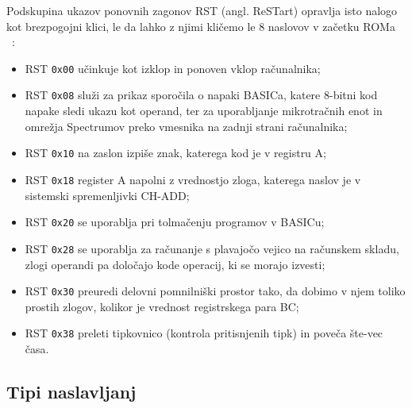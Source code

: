 \documentclass[a4paper, 12pt, openright]{book}
\begin{document}
    Podskupina ukazov ponovnih zagonov RST (angl. ReSTart) opravlja isto nalogo kot
    brezpogojni klici, le da lahko z njimi kličemo le 8 naslovov v začetku ROMa
    ~\cite{strojnijezikzaprocesorz80}:
    \begin{itemize}
        \item RST \texttt{0x00} učinkuje kot izklop in ponoven vklop računalnika;

        \item RST \texttt{0x08} služi za prikaz sporočila o napaki BASICa, katere
            8-bitni kod napake sledi ukazu kot operand, ter za uporabljanje
            mikrotračnih enot in omrežja Spectrumov preko vmesnika na zadnji
            strani računalnika;

        \item RST \texttt{0x10} na zaslon izpiše znak, katerega kod je v registru
            A;

        \item RST \texttt{0x18} register A napolni z vrednostjo zloga, katerega naslov
            je v sistemski spremenljivki CH-ADD;

        \item RST \texttt{0x20} se uporablja pri tolmačenju programov v BASICu;

        \item RST \texttt{0x28} se uporablja za računanje s plavajočo vejico na
            računskem skladu, zlogi operandi pa določajo kode operacij, ki se
            morajo izvesti;

        \item RST \texttt{0x30} preuredi delovni pomnilniški prostor tako, da dobimo
            v njem toliko prostih zlogov, kolikor je vrednost registrskega para
            BC;

        \item RST \texttt{0x38} preleti tipkovnico (kontrola pritisnjenih tipk)
            in poveča šte-vec časa.
    \end{itemize}

    \subsection{Tipi naslavljanj}
\end{document}
